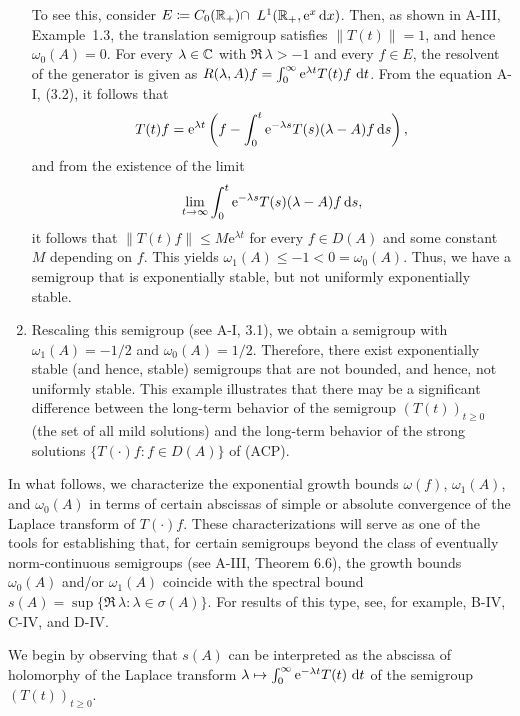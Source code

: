 \begin{example}
\begin{enumerate}[\upshape (i), wide, labelsep=1em]
To see this, consider $E \coloneqq C_0(\mathbb{R}_{+}) \cap $ $L^{1}(\mathbb{R}_{+},\mathrm{e}^{x}\mathop{}\!\mathrm{d}{x})$. Then, as shown in A-III, Example~1.3, the translation semigroup satisfies $\|T(t)\| = 1$, and hence $\omega_{0}(A) = 0$. 
For every $\lambda \in \mathbb{C}$ with $\Re\,\lambda > -1$ and every $f \in E$, the resolvent of the generator is given as $R(\lambda,A)f = \int_{0}^{\infty} \mathrm{e}^{\lambda t} T(t)f \,\mathop{}\!\mathrm{d}{t}$.
From the equation A-I, (3.2), it follows that
\[
T(t)f = \mathrm{e}^{\lambda t}\left(f - \int_{0}^{t} \mathrm{e}^{-\lambda s} T(s) (\lambda - A)f  \mathop{}\!\mathrm{d}{s}\right),
\]
and from the existence of the limit
\[
\lim_{t \to \infty} \int_{0}^{t} \mathrm{e}^{-\lambda s} T(s) (\lambda - A)f  \mathop{}\!\mathrm{d}{s},
\] 
it follows that 
$\|T(t)f\| \leq M\mathrm{e}^{\lambda t}$ for every $f \in D(A)$ and some constant $M$ depending on $f$. This yields $\omega_{1}(A) \le -1 < 0 = \omega_{0}(A)$. 
Thus, we have a semigroup that is exponentially stable, but not uniformly exponentially stable.

\item
Rescaling this semigroup (see A-I, 3.1), we obtain a semigroup with $\omega_{1}(A) = -1/2 $ and 
$\omega_{0}(A) = 1/2 $.
Therefore, there exist exponentially stable (and hence, stable) semigroups that are not bounded, and hence, not uniformly stable.
This example illustrates that there may be a significant difference between the long-term behavior of the semigroup $(T(t))_{t \geq 0}$ (\ie the set of all mild solutions) and the long-term behavior of the strong solutions $\{T(\cdot)f \colon f \in D(A)\}$ of (ACP). 
\end{enumerate}
\end{example}
In what follows, we characterize the exponential growth bounds $\omega(f)$, $\omega_{1}(A)$, and $\omega_{0}(A)$ in terms of certain abscissas of simple or absolute convergence of the Laplace transform of $T(\cdot)f$. 
These characterizations will serve as one of the tools for 
establishing that, for certain semigroups beyond the class of eventually norm-continuous semigroups (see A-III, Theorem 6.6), the growth bounds $\omega_{0}(A)$ and/or $\omega_{1}(A)$ coincide with the spectral bound $s(A) = \sup\{\Re\,\lambda\colon\lambda \in \sigma(A)\}$. For results of this type, see, for example, B-IV, C-IV, and D-IV.

We begin by observing that $s(A)$ can be interpreted as the abscissa of holomorphy of the Laplace transform $\lambda \mapsto \int_{0}^{\infty} \mathrm{e}^{-\lambda t} T(t) \,\mathop{}\!\mathrm{d}{t}$ of the semigroup $(T(t))_{t \geq 0}$.

